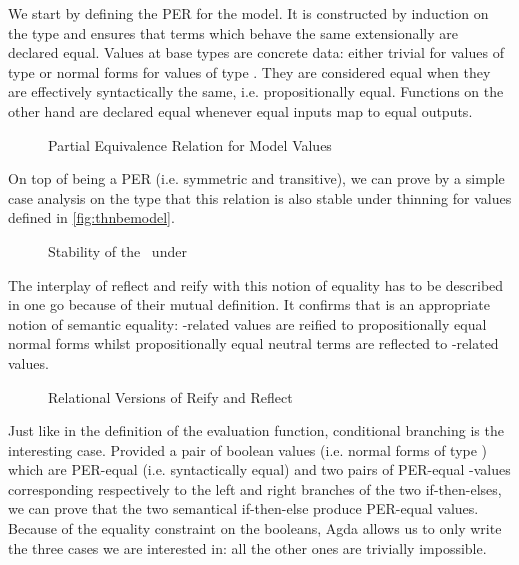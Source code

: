 We start by defining the PER for the model. It is constructed by
induction on the type and ensures that terms which behave the same
extensionally are declared equal. Values at base types are concrete
data: either trivial for values of type  or normal forms
for values of type . They are considered equal when they
are effectively syntactically the same, i.e. propositionally equal.
Functions on the other hand are declared equal whenever equal inputs
map to equal outputs.

\begin{figure}[h]
\caption{Partial Equivalence Relation for Model Values\label{fig:nbeper}}
\end{figure}

On top of being a PER (i.e. symmetric and transitive), we can prove by a
simple case analysis on the type that this relation is also stable under
thinning for  values defined in \cref{fig:thnbemodel}.

\begin{figure}[h]
\caption{Stability of the ~under \label{fig:nbeperth}}
\end{figure}

The interplay of reflect and reify with this notion of equality has to be described
in one go because of their mutual definition. It confirms that  is an appropriate
notion of semantic equality: -related values are reified to propositionally
equal normal forms whilst propositionally equal neutral terms are reflected
to -related values.

\begin{figure}[h]
\caption{Relational Versions of Reify and Reflect\label{fig:nbeperreifyreflect}}
\end{figure}

Just like in the definition of the evaluation function, conditional branching is the
interesting case. Provided a pair of boolean values (i.e. normal forms of type
) which are PER-equal (i.e. syntactically equal) and two pairs of PER-equal
-values corresponding respectively to the left and right branches of the two
if-then-elses, we can prove that the two semantical if-then-else produce PER-equal values.
Because of the equality constraint on the booleans, Agda allows us to only write the
three cases we are interested in: all the other ones are trivially impossible.

